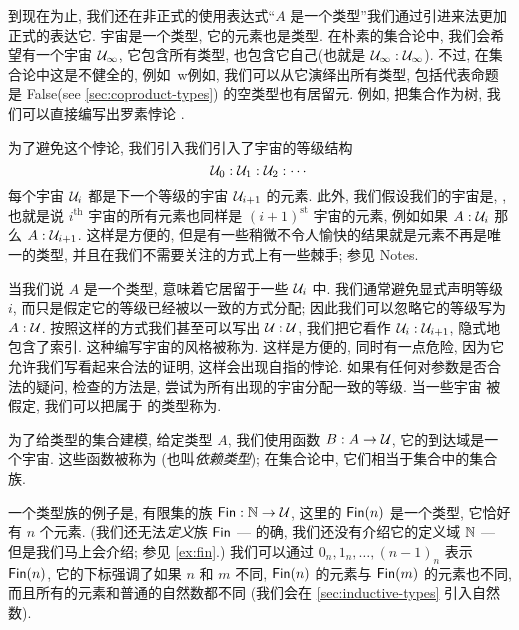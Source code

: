 到现在为止, 我们还在非正式的使用表达式``$A$ 是一个类型''我们通过引进来法更加正式的表达它.   宇宙是一个类型, 它的元素也是类型. 在朴素的集合论中, 我们会希望有一个宇宙 $\mathcal{U}_\infty$, 它包含所有类型, 也包含它自己(也就是 $\mathcal{U}_\infty : \mathcal{U}_\infty$). 不过, 在集合论中这是不健全的, 例如\ w例如, 我们可以从它演绎出所有类型, 包括代表命题是 False(see \cref{sec:coproduct-types}) 的空类型也有居留元. 例如, 把集合作为树, 我们可以直接编写出罗素悖论 \cite{coquand:paradox}.

为了避免这个悖论, 我们引入我们引入了宇宙的等级结构  \[ \mathcal{U}_0 : \mathcal{U}_1 : \mathcal{U}_2 : \cdots \] 每个宇宙 $\mathcal{U}_i$ 都是下一个等级的宇宙 $\mathcal{U}_{i+1}$ 的元素. 此外, 我们假设我们的宇宙是,  , 也就是说 $i^{\mathrm{th}}$ 宇宙的所有元素也同样是 $(i+1)^{\mathrm{st}}$ 宇宙的元素, 例如如果 $A:\mathcal{U}_i$ 那么 $A:\mathcal{U}_{i+1}$. 这样是方便的, 但是有一些稍微不令人愉快的结果就是元素不再是唯一的类型, 并且在我们不需要关注的方式上有一些棘手; 参见 Notes.

当我们说 $A$ 是一个类型, 意味着它居留于一些 $\mathcal{U}_i$ 中. 我们通常避免显式声明等级   $i$, 而只是假定它的等级已经被以一致的方式分配; 因此我们可以忽略它的等级写为 $A:\mathcal{U}$. 按照这样的方式我们甚至可以写出 $\mathcal{U}:\mathcal{U}$, 我们把它看作 $\mathcal{U}_i:\mathcal{U}_{i+1}$, 隐式地包含了索引. 这种编写宇宙的风格被称为.  这样是方便的, 同时有一点危险,  因为它允许我们写看起来合法的证明, 这样会出现自指的悖论. 如果有任何对参数是否合法的疑问, 检查的方法是, 尝试为所有出现的宇宙分配一致的等级. 当一些宇宙 \UU 被假定, 我们可以把属于 \UU 的类型称为.  

为了给类型的集合建模, 给定类型 $A$, 我们使用函数 $B : A \to \mathcal{U}$, 它的到达域是一个宇宙. 这些函数被称为 (也叫\emph{依赖类型});    在集合论中, 它们相当于集合中的集合族.

 一个类型族的例子是, 有限集的族 $\mathsf{Fin} : \mathbb{N} \to \mathcal{U}$, 这里的 $\mathsf{Fin}(n)$ 是一个类型, 它恰好有 $n$ 个元素. (我们还无法\emph{定义}族 $\mathsf{Fin}$ --- 的确, 我们还没有介绍它的定义域 $\mathbb{N}$ --- 但是我们马上会介绍; 参见 \cref{ex:fin}.) 我们可以通过 $0_n,1_n,\dots,(n-1)_n$ 表示 $\mathsf{Fin}(n)$, 它的下标强调了如果 $n$ 和 $m$ 不同,  $\mathsf{Fin}(n)$ 的元素与 $\mathsf{Fin}(m)$ 的元素也不同, 而且所有的元素和普通的自然数都不同 (我们会在 \cref{sec:inductive-types} 引入自然数). 


